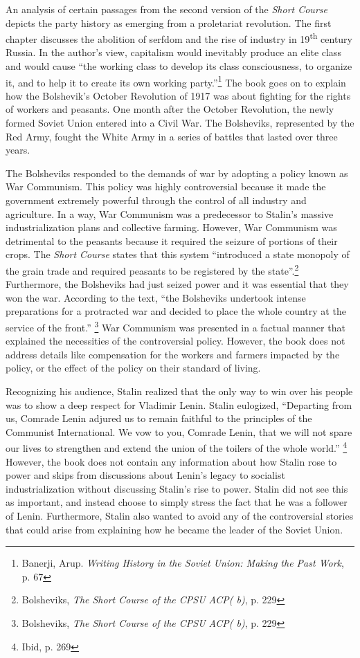 \documentclass[a4paper, twocolumn]{article}
\begin{document}
An analysis of certain passages from the second version of the \emph{Short
Course} depicts the party history as emerging from a proletariat
revolution. The first chapter discusses the abolition of serfdom and
the rise of industry in 19\textsuperscript{th} century Russia. In the author's view,
capitalism would inevitably produce an elite class and would cause
``the working class to develop its class consciousness, to organize it,
and to help it to create its own working party.''\footnote{Banerji, Arup. \emph{Writing History in the Soviet Union: Making the Past Work}, p. 67} The book goes on to
explain how the Bolshevik's October Revolution of 1917 was about
fighting for the rights of workers and peasants. One month after the
October Revolution, the newly formed Soviet Union entered into a Civil
War.  The Bolsheviks, represented by the Red Army, fought the White
Army in a series of battles that lasted over three years.

The Bolsheviks responded to the demands of war by adopting a policy
known as War Communism. This policy was highly controversial because
it made the government extremely powerful through the control of all
industry and agriculture. In a way, War Communism was a predecessor to
Stalin's massive industrialization plans and collective farming.
However, War Communism was detrimental to the peasants because it
required the seizure of portions of their crops. The \emph{Short Course}
states that this system ``introduced a state monopoly of the grain
trade and required peasants to be registered by the state''.\footnote{Bolsheviks, \emph{The Short Course of the CPSU ACP( b)}, p. 229}
Furthermore, the Bolsheviks had just seized power and it was essential
that they won the war. According to the text, ``the Bolsheviks
undertook intense preparations for a protracted war and
decided to place the whole country at the service of the
front.'' \footnote{Bolsheviks, \emph{The Short Course of the CPSU ACP( b)}, p. 229} War Communism was presented in a factual manner that
explained the necessities of the controversial policy. However, the
book does not address details like compensation for the workers and
farmers impacted by the policy, or the effect of the policy on their
standard of living.

Recognizing his audience, Stalin realized that the only way to win
over his people was to show a deep respect for Vladimir Lenin. Stalin
eulogized, ``Departing from us, Comrade Lenin adjured us to remain
faithful to the principles of the Communist International. We vow to
you, Comrade Lenin, that we will not spare our lives to strengthen and
extend the union of the toilers of the whole world.'' \footnote{Ibid, p. 269} However, the
book does not contain any information about how Stalin rose to power
and skips from discussions about Lenin's legacy to socialist
industrialization without discussing Stalin’s rise to power. Stalin
did not see this as important, and instead choose to simply stress the fact
that he was a follower of Lenin. Furthermore, Stalin also wanted to
avoid any of the controversial stories that could arise from
explaining how he became the leader of the Soviet Union.
\end{document}
